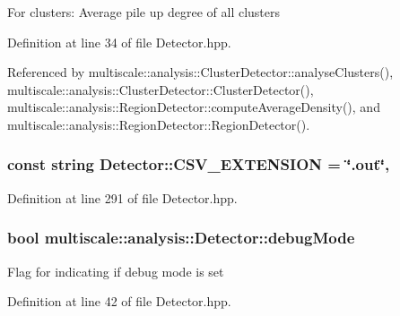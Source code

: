 For clusters\-: Average pile up degree of all clusters 

Definition at line 34 of file Detector.\-hpp.



Referenced by multiscale\-::analysis\-::\-Cluster\-Detector\-::analyse\-Clusters(), multiscale\-::analysis\-::\-Cluster\-Detector\-::\-Cluster\-Detector(), multiscale\-::analysis\-::\-Region\-Detector\-::compute\-Average\-Density(), and multiscale\-::analysis\-::\-Region\-Detector\-::\-Region\-Detector().

\hypertarget{classmultiscale_1_1analysis_1_1Detector_a5458417daa8430ea8ebbe1c25cb26f41}{
\subsubsection[{C\-S\-V\-\_\-\-E\-X\-T\-E\-N\-S\-I\-O\-N}]{\setlength{\rightskip}{0pt plus 5cm}const string Detector\-::\-C\-S\-V\-\_\-\-E\-X\-T\-E\-N\-S\-I\-O\-N = \char`\"{}.out\char`\"{}\hspace{0.3cm}{\ttfamily [static]}, {\ttfamily [protected]}}}\label{classmultiscale_1_1analysis_1_1Detector_a5458417daa8430ea8ebbe1c25cb26f41}


Definition at line 291 of file Detector.\-hpp.

\hypertarget{classmultiscale_1_1analysis_1_1Detector_a4b42f796957efd6ee0b8cf7645494a65}{
\subsubsection[{debug\-Mode}]{\setlength{\rightskip}{0pt plus 5cm}bool multiscale\-::analysis\-::\-Detector\-::debug\-Mode\hspace{0.3cm}{\ttfamily [protected]}}}\label{classmultiscale_1_1analysis_1_1Detector_a4b42f796957efd6ee0b8cf7645494a65}
Flag for indicating if debug mode is set 

Definition at line 42 of file Detector.\-hpp.

